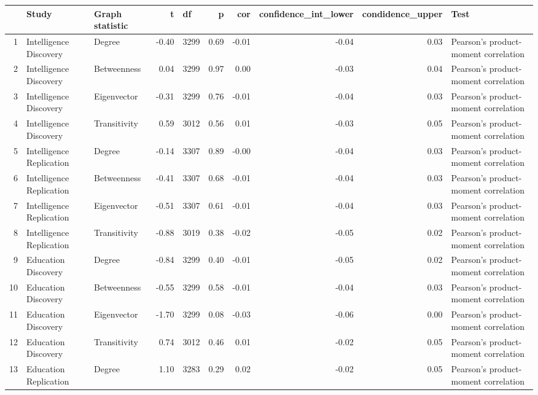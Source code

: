 \begin{table}[ht]
\centering
  \begin{adjustbox}{max width=\textwidth}
\begin{tabular}{rllrlrrrrl}
  \hline

 & Study & Graph statistic & t & df & p & cor & confidence\_int\_lower & condidence\_upper & Test \\ 
  \hline
1 & Intelligence Discovery & Degree & -0.40 & 3299 & 0.69 & -0.01 & -0.04 & 0.03 & Pearson's product-moment correlation \\ 
  2 & Intelligence Discovery & Betweenness & 0.04 & 3299 & 0.97 & 0.00 & -0.03 & 0.04 & Pearson's product-moment correlation \\ 
  3 & Intelligence Discovery & Eigenvector & -0.31 & 3299 & 0.76 & -0.01 & -0.04 & 0.03 & Pearson's product-moment correlation \\ 
  4 & Intelligence Discovery & Transitivity & 0.59 & 3012 & 0.56 & 0.01 & -0.03 & 0.05 & Pearson's product-moment correlation \\ 
  5 & Intelligence Replication & Degree & -0.14 & 3307 & 0.89 & -0.00 & -0.04 & 0.03 & Pearson's product-moment correlation \\ 
  6 & Intelligence Replication & Betweenness & -0.41 & 3307 & 0.68 & -0.01 & -0.04 & 0.03 & Pearson's product-moment correlation \\ 
  7 & Intelligence Replication & Eigenvector & -0.51 & 3307 & 0.61 & -0.01 & -0.04 & 0.03 & Pearson's product-moment correlation \\ 
  8 & Intelligence Replication & Transitivity & -0.88 & 3019 & 0.38 & -0.02 & -0.05 & 0.02 & Pearson's product-moment correlation \\ 
  9 & Education Discovery & Degree & -0.84 & 3299 & 0.40 & -0.01 & -0.05 & 0.02 & Pearson's product-moment correlation \\ 
  10 & Education Discovery & Betweenness & -0.55 & 3299 & 0.58 & -0.01 & -0.04 & 0.03 & Pearson's product-moment correlation \\ 
  11 & Education Discovery & Eigenvector & -1.70 & 3299 & 0.08 & -0.03 & -0.06 & 0.00 & Pearson's product-moment correlation \\ 
  12 & Education Discovery & Transitivity & 0.74 & 3012 & 0.46 & 0.01 & -0.02 & 0.05 & Pearson's product-moment correlation \\ 
  13 & Education Replication & Degree & 1.10 & 3283 & 0.29 & 0.02 & -0.02 & 0.05 & Pearson's product-moment correlation \\ 

\end{tabular}
\end{adjustbox}
\end{table}
